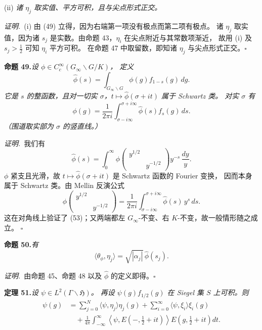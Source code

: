 (ii) \emph{诸 $\eta_{j}$ 取实值、平方可积，且与尖点形式正交。}

\smallskip
\noindent\emph{证明.}\ (i) 由 (49) 立得，因为右端第一项没有极点而第二项有极点。
诸 $\eta_{j}$ 取实值，因为诸 $s_{j}$ 是实数。由命题 43，$\eta_{i}$ 在尖点附近与其常数项渐近，
故用 (i) 及 $s_{j}>\tfrac12$ 可知 $\eta_{i}$ 平方可积。
在命题 47 中取留数，即知诸 $\eta_{j}$ 与尖点形式正交。\hfill$\square$

\par\medskip\noindent\textbf{命题 49.}\quad\emph{设 $\phi\in C_{c}^{\infty}(G_{\infty}\backslash G/K)$，
定义}
\begin{equation}\tag{52}
\hat\phi(s)=\int_{G_{\infty}\backslash G}\phi(g)f_{1-s}(g)\,dg .
\end{equation}
\emph{它是 $s$ 的整函数，且对一切实 $\sigma$，$t\mapsto\hat\phi(\sigma+it)$ 属于 Schwartz 类。
对实 $\sigma$ 有}
\begin{equation}\tag{53}
\phi(g)=\frac{1}{2\pi i}\int_{\sigma-i\infty}^{\sigma+i\infty}\hat\phi(s)f_{s}(g)\,ds .
\end{equation}
\emph{（围道取实部为 $\sigma$ 的竖直线。）}

\smallskip
\noindent\emph{证明.}\ 我们有
\[
\hat\phi(s)=\int_{0}^{\infty}\phi\begin{pmatrix}y^{1/2}&\\&y^{-1/2}\end{pmatrix}
y^{-s}\,\frac{dy}{y}.
\]
$\phi$ 紧支且光滑，故 $t\mapsto\hat\phi(\sigma+it)$ 是 Schwartz 函数的 Fourier 变换，
因而本身属于 Schwartz 类。由 Mellin 反演公式
\begin{equation}\tag{54}
\phi\begin{pmatrix}y^{1/2}&\\&y^{-1/2}\end{pmatrix}
=\frac{1}{2\pi i}\int_{\sigma-i\infty}^{\sigma+i\infty}\hat\phi(s)\,y^{s}\,ds .
\end{equation}
这在对角线上验证了 (53)；又两端都左 $G_{\infty}$-不变、右 $K$-不变，故一般情形随之成立。
\hfill$\square$

\par\medskip\noindent\textbf{命题 50.}\quad\emph{有}
\[
\langle\theta_{\phi},\eta_{j}\rangle=\sqrt{|\alpha_{j}|}\,\hat\phi(s_{j}).
\]

\smallskip
\noindent\emph{证明.}\ 由命题 45、命题 48 以及 $\hat\phi$ 的定义即得。\hfill$\square$

\par\medskip\noindent\textbf{定理 51.}\quad\emph{设 $\psi\in L^{2}(\Gamma\backslash\mathfrak{H})$。
再设 $\psi(g)f_{1/2}(g)$ 在 Siegel 集 $S$ 上可积。则}
\begin{equation}\tag{55}
\begin{aligned}
\psi(g)&=\sum_{j=0}^{N}\langle\psi,\eta_{j}\rangle\eta_{j}(g)
+\sum_{i=0}^{\infty}\langle\psi,\xi_{i}\rangle\xi_{i}(g)\\
&\quad+\frac{1}{4\pi}\int_{-\infty}^{\infty}
\left\langle\psi,E\left(-,\frac12+it\right)\right\rangle
E\left(g,\frac12+it\right)dt .
\end{aligned}
\end{equation}

